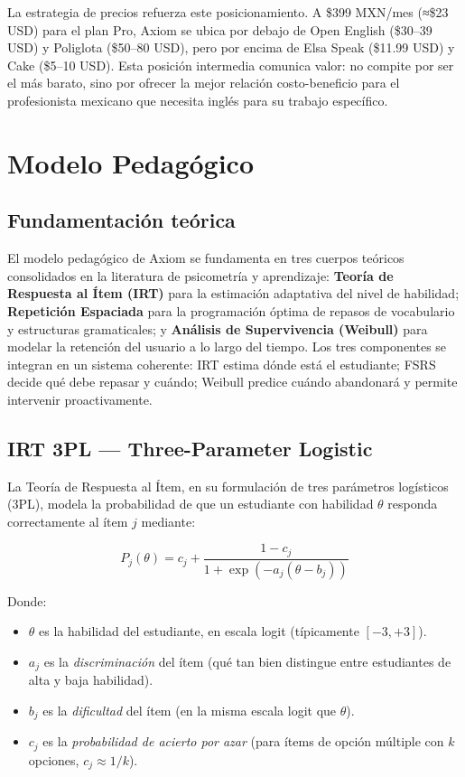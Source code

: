 \documentclass[10pt,a4paper,oneside]{report}
\begin{document}
La estrategia de precios refuerza este posicionamiento. A \$399 MXN/mes (≈\$23 USD) para el plan Pro, Axiom se ubica por debajo de Open English (\$30--39 USD) y Poliglota (\$50--80 USD), pero por encima de Elsa Speak (\$11.99 USD) y Cake (\$5--10 USD). Esta posición intermedia comunica valor: no compite por ser el más barato, sino por ofrecer la mejor relación costo-beneficio para el profesionista mexicano que necesita inglés para su trabajo específico.

\chapter{Modelo Pedagógico}

\section{Fundamentación teórica}
El modelo pedagógico de Axiom se fundamenta en tres cuerpos teóricos consolidados en la literatura de psicometría y aprendizaje: \textbf{Teoría de Respuesta al Ítem (IRT)} para la estimación adaptativa del nivel de habilidad; \textbf{Repetición Espaciada} para la programación óptima de repasos de vocabulario y estructuras gramaticales; y \textbf{Análisis de Supervivencia (Weibull)} para modelar la retención del usuario a lo largo del tiempo. Los tres componentes se integran en un sistema coherente: IRT estima dónde está el estudiante; FSRS decide qué debe repasar y cuándo; Weibull predice cuándo abandonará y permite intervenir proactivamente.

\section{IRT 3PL — Three-Parameter Logistic}
La Teoría de Respuesta al Ítem, en su formulación de tres parámetros logísticos (3PL), modela la probabilidad de que un estudiante con habilidad $\theta$ responda correctamente al ítem $j$ mediante:

\begin{equation}
P_j(\theta) = c_j + \frac{1 - c_j}{1 + \exp\left(-a_j (\theta - b_j)\right)}
\end{equation}

Donde:
\begin{itemize}[leftmargin=1.4em]
\item $\theta$ es la habilidad del estudiante, en escala logit (típicamente $[-3, +3]$).
\item $a_j$ es la \textit{discriminación} del ítem (qué tan bien distingue entre estudiantes de alta y baja habilidad).
\item $b_j$ es la \textit{dificultad} del ítem (en la misma escala logit que $\theta$).
\item $c_j$ es la \textit{probabilidad de acierto por azar} (para ítems de opción múltiple con $k$ opciones, $c_j \approx 1/k$).
\end{itemize}
\end{document}
